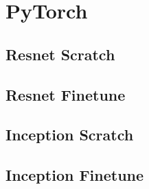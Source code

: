 \newpage



\section{PyTorch}

\subsection{Resnet Scratch}
\begin{figure}[H]

\end{figure}

\subsection{Resnet Finetune}
\begin{figure}[H]

\end{figure}

\newpage

\subsection{Inception Scratch}
\begin{figure}[H]

\end{figure}
\subsection{Inception Finetune}
\begin{figure}[H]

\end{figure}
